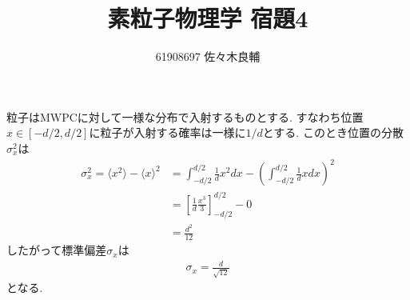 \documentclass[uplatex,a4j,11pt,dvipdfmx]{jsarticle}
\begin{document}
\title{素粒子物理学 宿題4}
\author{61908697 佐々木良輔}
\date{}
\maketitle
粒子はMWPCに対して一様な分布で入射するものとする.
すなわち位置$x\in[-d/2,d/2]$に粒子が入射する確率は一様に$1/d$とする.
このとき位置の分散$\sigma_x^2$は
\begin{align*}
  \sigma_x^2=\langle x^2\rangle-\langle x\rangle^2&=\int_{-d/2}^{d/2}\frac{1}{d}x^2dx-\left(\int_{-d/2}^{d/2}\frac{1}{d}xdx\right)^2\\
  &=\left[\frac{1}{d}\frac{x^3}{3}\right]_{-d/2}^{d/2}-0\\
  &=\frac{d^2}{12}
\end{align*}
したがって標準偏差$\sigma_x$は
\begin{align*}
  \sigma_x=\frac{d}{\sqrt{12}}
\end{align*}
となる.

\end{document}
